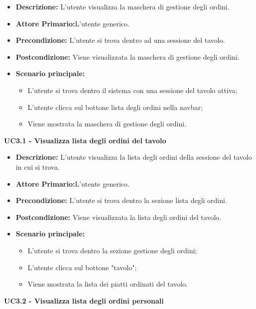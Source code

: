 \begin{itemize}
    \item \textbf{Descrizione:} L'utente visualizza la maschera di gestione degli ordini.
    \item \textbf{Attore Primario:}L'utente generico.
    \item \textbf{Precondizione:} L'utente si trova dentro ad una sessione del tavolo.
    \item \textbf{Postcondizione:} Viene visualizzata la maschera di gestione degli ordini.
    \item \textbf{Scenario principale:}
    \begin{itemize}
        \item L'utente si trova dentro il sistema con una sessione del tavolo attiva;
        \item L'utente clicca sul bottone lista degli ordini nella navbar;
        \item Viene mostrata la maschera di gestione degli ordini.
    \end{itemize}
\end{itemize}
\textbf{UC3.1 - Visualizza lista degli ordini del tavolo}
\begin{itemize}
    \item \textbf{Descrizione:} L'utente visualizza la lista degli ordini della sessione del tavolo in cui si trova. 
    \item \textbf{Attore Primario:}L'utente generico.
    \item \textbf{Precondizione:} L'utente si trova dentro la sezione lista degli ordini.
    \item \textbf{Postcondizione:} Viene visualizzata la lista degli ordini del tavolo.
    \item \textbf{Scenario principale:}
    \begin{itemize}
        \item L'utente si trova dentro la sezione gestione degli ordini;
        \item L'utente clicca sul bottone "tavolo";
        \item Viene mostrata la lista dei piatti ordinati del tavolo.
    \end{itemize}
\end{itemize}
\textbf{UC3.2 - Visualizza lista degli ordini personali}

